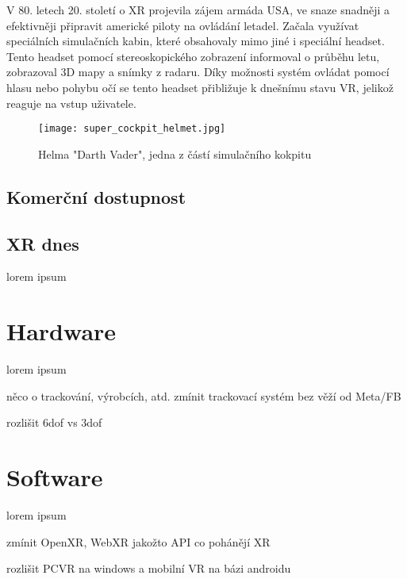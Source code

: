 V 80. letech 20. století o XR projevila zájem armáda USA, ve snaze snadněji a efektivněji připravit americké piloty na ovládání letadel. Začala využívat speciálních simulačních kabin, které obsahovaly mimo jiné i speciální headset. Tento headset pomocí stereoskopického zobrazení informoval o průběhu letu, zobrazoval 3D mapy a snímky z radaru. Díky možnosti systém ovládat pomocí hlasu nebo pohybu očí se tento headset přibližuje k dnešnímu stavu VR, jelikož reaguje na vstup uživatele. \cite{otechnice}

\begin{figure}[H]
    \centering
    \texttt{[image: super\_cockpit\_helmet.jpg]}
    \caption{Helma "Darth Vader", jedna z částí simulačního kokpitu \cite{super_cockpit_image}}
    \label{sensorama}
\end{figure}

\section{Komerční dostupnost}

\section{XR dnes}

lorem ipsum

\chapter{Hardware}
lorem ipsum

něco o trackování, výrobcích, atd. zmínit trackovací systém bez věží od Meta/FB

rozlišit 6dof vs 3dof

\chapter{Software}
lorem ipsum

zmínit OpenXR, WebXR jakožto API co pohánějí XR

rozlišit PCVR na windows a mobilní VR na bázi androidu